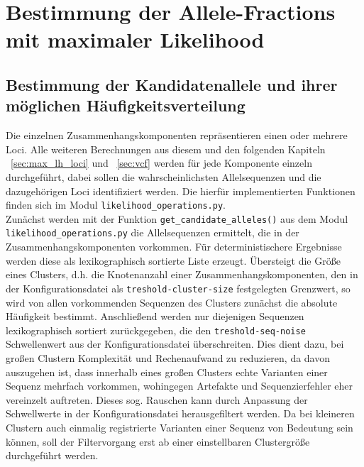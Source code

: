 \section{Bestimmung der Allele-Fractions mit maximaler Likelihood} \label{sec:max_lh_allele}
\subsection{Bestimmung der Kandidatenallele und ihrer möglichen Häufigkeitsverteilung} \label{subsec:cand_allele}

Die einzelnen Zusammenhangskomponenten repräsentieren einen oder mehrere Loci. Alle weiteren Berechnungen aus diesem und den folgenden Kapiteln ~\ref{sec:max_lh_loci} und ~\ref{sec:vcf} werden für jede Komponente einzeln durchgeführt, dabei sollen die wahrscheinlichsten Allelsequenzen und die dazugehörigen Loci identifiziert werden. Die hierfür implementierten Funktionen finden sich im Modul \lstinline|likelihood_operations.py|. \\

Zunächst werden mit der Funktion \lstinline|get_candidate_alleles()| aus dem Modul \linebreak \lstinline|likelihood_operations.py| die Allelsequenzen ermittelt, die in der Zusammenhangskomponenten vorkommen. Für deterministischere Ergebnisse werden diese als lexikographisch sortierte Liste erzeugt. Übersteigt die Größe eines Clusters, d.h. die Knotenanzahl einer Zusammenhangskomponenten, den in der Konfigurationsdatei als \lstinline|treshold-cluster-size| festgelegten Grenzwert, so wird von allen vorkommenden Sequenzen des Clusters zunächst die absolute Häufigkeit bestimmt. Anschließend werden nur diejenigen Sequenzen lexikographisch sortiert zurückgegeben, die den \lstinline|treshold-seq-noise| Schwellenwert aus der Konfigurationsdatei überschreiten. Dies dient dazu, bei großen Clustern Komplexität und Rechenaufwand zu reduzieren, da davon auszugehen ist, dass innerhalb eines großen Clusters echte Varianten einer Sequenz mehrfach vorkommen, wohingegen Artefakte und Sequenzierfehler eher vereinzelt auftreten. Dieses sog. Rauschen kann durch Anpassung der Schwellwerte in der Konfigurationsdatei herausgefiltert werden. Da bei kleineren Clustern auch einmalig registrierte Varianten einer Sequenz von Bedeutung sein können, soll der Filtervorgang erst ab einer einstellbaren Clustergröße durchgeführt werden. \\


